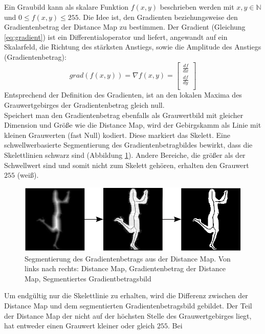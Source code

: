 Ein Graubild kann als skalare Funktion $f(x,y)$ beschrieben werden mit $x,y \in \mathbb{N}$ und
$0 \leq f(x,y) \leq 255$. 
Die Idee ist, den Gradienten beziehungsweise den Gradientenbetrag der Distance Map zu bestimmen. Der Gradient (Gleichung \ref{eq:gradient}) ist ein Differentialoperator und liefert, angewandt auf ein Skalarfeld, die Richtung des stärksten Anstiegs, sowie die Amplitude des Anstiegs (Gradientenbetrag):
\begin{equation}
\label{eq:gradient}
   grad(f(x,y)) = \nabla f(x,y) = \begin{bmatrix}
         \frac{df}{dx}        \\[0.3em]
         \frac{df}{dy} \\[0.3em]
      \end{bmatrix}
\end{equation}
Entsprechend der Definition des Gradienten, ist an den lokalen Maxima des Grauwertgebirges der Gradientenbetrag gleich null.\\
Speichert man den Gradientenbetrag ebenfalls als Grauwertbild mit gleicher Dimension und Größe wie die Distance Map, wird der Gebirgskamm als Linie mit kleinen Grauwerten (fast Null) kodiert. Diese markiert das Skelett. Eine schwellwerbasierte Segmentierung des Gradientenbetragbildes bewirkt, dass die Skelettlinien schwarz sind (Abbildung \ref{fig:bildung_gradient}). Andere Bereiche, die größer als der Schwellwert sind und somit nicht zum Skelett gehören, erhalten den Grauwert $255$ (weiß). 
\begin{figure}
\centering
\includegraphics[width=1.0\linewidth]{./fig/bildung_gradient}
\caption{Segmentierung des Gradientenbetrags aus der Distance Map. Von links nach rechts: Distance Map, Gradientenbetrag der Distance Map, Segmentiertes Gradientbetragsbild}
\label{fig:bildung_gradient}
\end{figure}
\FloatBarrier
\noindent
Um endgültig nur die Skelettlinie zu erhalten, wird die Differenz
zwischen der Distance Map und dem segmentierten Gradientenbetragsbild gebildet. Der Teil der Distance Map der nicht
auf der höchsten Stelle des Grauwertgebirges liegt, hat entweder einen Grauwert kleiner oder gleich $255$. Bei
